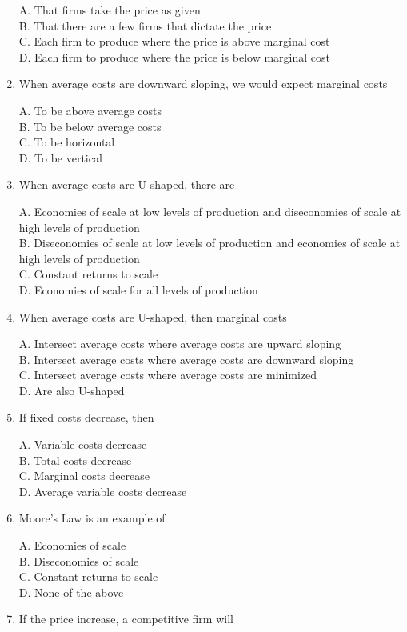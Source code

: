 \documentclass[
]{book}
\begin{document}
\begin{enumerate}
  A. That firms take the price as given\\
  B. That there are a few firms that dictate the price\\
  C. Each firm to produce where the price is above marginal cost\\
  D. Each firm to produce where the price is below marginal cost
\item
  When average costs are downward sloping, we would expect marginal costs

  A. To be above average costs\\
  B. To be below average costs\\
  C. To be horizontal\\
  D. To be vertical
\item
  When average costs are U-shaped, there are

  A. Economies of scale at low levels of production and diseconomies of scale at high levels of production\\
  B. Diseconomies of scale at low levels of production and economies of scale at high levels of production\\
  C. Constant returns to scale\\
  D. Economies of scale for all levels of production
\item
  When average costs are U-shaped, then marginal costs

  A. Intersect average costs where average costs are upward sloping\\
  B. Intersect average costs where average costs are downward sloping\\
  C. Intersect average costs where average costs are minimized\\
  D. Are also U-shaped
\item
  If fixed costs decrease, then

  A. Variable costs decrease\\
  B. Total costs decrease\\
  C. Marginal costs decrease\\
  D. Average variable costs decrease
\item
  Moore's Law is an example of

  A. Economies of scale\\
  B. Diseconomies of scale\\
  C. Constant returns to scale\\
  D. None of the above
\item
  If the price increase, a competitive firm will


\end{enumerate}
\end{document}
